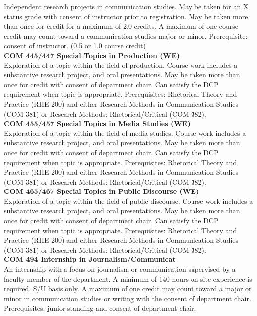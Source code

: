 \documentclass[
  letterpaper,
]{scrbook}
\begin{document}
Independent research projects in communication studies. May be taken for
an X status grade with consent of instructor prior to registration. May
be taken more than once for credit for a maximum of 2.0 credits. A
maximum of one course credit may count toward a communication studies
major or minor. Prerequisite: consent of instructor. (0.5 or 1.0 course
credit)\\
\textbf{COM 445/447 Special Topics in Production (WE)}\\
Exploration of a topic within the field of production. Course work
includes a substantive research project, and oral presentations. May be
taken more than once for credit with consent of department chair. Can
satisfy the DCP requirement when topic is appropriate. Prerequisites:
Rhetorical Theory and Practice (RHE-200) and either Research Methods in
Communication Studies (COM-381) or Research Methods: Rhetorical/Critical
(COM-382).\\
\textbf{COM 455/457 Special Topics in Media Studies (WE)}\\
Exploration of a topic within the field of media studies. Course work
includes a substantive research project, and oral presentations. May be
taken more than once for credit with consent of department chair. Can
satisfy the DCP requirement when topic is appropriate. Prerequisites:
Rhetorical Theory and Practice (RHE-200) and either Research Methods in
Communication Studies (COM-381) or Research Methods: Rhetorical/Critical
(COM-382).\\
\textbf{COM 465/467 Special Topics in Public Discourse (WE)}\\
Exploration of a topic within the field of public discourse. Course work
includes a substantive research project, and oral presentations. May be
taken more than once for credit with consent of department chair. Can
satisfy the DCP requirement when topic is appropriate. Prerequisites:
Rhetorical Theory and Practice (RHE-200) and either Research Methods in
Communication Studies (COM-381) or Research Methods: Rhetorical/Critical
(COM-382).\\
\textbf{COM 494 Internship in Journalism/Communicat}\\
An internship with a focus on journalism or communication supervised by
a faculty member of the department. A minimum of 140 hours on-site
experience is required. S/U basis only. A maximum of one credit may
count toward a major or minor in communication studies or writing with
the consent of department chair. Prerequisites: junior standing and
consent of department chair.
\end{document}
